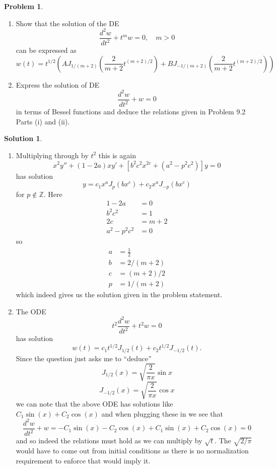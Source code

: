 \documentclass[10pt]{article}
\theoremstyle{definition}
\newtheorem{problem}{Problem}
\newtheorem{soln}{Solution}
\begin{document}
\begin{problem}~
\begin{enumerate}[label=(\alph*)]
  \item Show that the solution of the DE
        $$\frac{d^2w}{dt^2}+t^mw=0,\quad m>0$$
        can be expressed as
        $$w(t)=t^{1/2}\left(AJ_{1/(m+2)}\left(\frac{2}{m+2}t^{(m+2)/2}\right)+BJ_{-1/(m+2)}\left(\frac{2}{m+2}t^{(m+2)/2}\right)\right)$$
  \item Express the solution of DE
        $$\frac{d^2w}{dt^2}+w=0$$
        in terms of Bessel functions and deduce the relations given in Problem 9.2 Parts (i) and (ii).
\end{enumerate}
\end{problem}
\begin{soln}~
  \begin{enumerate}[label=(\alph*)]
    \item Multiplying through by $t^2$ this is again $$x^2y''+(1-2a)xy'+\left[b^2c^2x^{2c}+(a^2-p^2c^2)\right]y=0$$
          has solution
          $$y=c_1x^aJ_p(bx^c)+c_2x^aJ_{-p}(bx^c)$$
          for $p\notin \mathbb{Z}$. Here
          \begin{align*}
            1-2a       & =0   \\
            b^2c^2     & =1   \\
            2c         & =m+2 \\
            a^2-p^2c^2 & =0
          \end{align*}
          so
          \begin{align*}
            a & =\frac{1}{2} \\
            b & =2/(m+2)     \\
            c & =(m+2)/2     \\
            p & =1/(m+2)
          \end{align*}
          which indeed gives us the solution given in the problem statement.
    \item The ODE $$t^2\frac{d^2w}{dt^2}+t^2w=0$$
          has solution
          $$w(t)=c_1t^{1/2}J_{1/2}(t)+c_2t^{1/2}J_{-1/2}(t).$$
          Since the question just asks me to ``deduce''
          $$J_{1/2}(x)=\sqrt{\frac{2}{\pi x}}\sin x$$
          $$J_{-1/2}(x)=\sqrt{\frac{2}{\pi x}}\cos x$$
          we can note that the above ODE has solutions like $C_1\sin(x)+C_2\cos(x)$ and when plugging these in we see that
          $$\frac{d^2w}{dt^2}+w=-C_1\sin(x)-C_2\cos(x)+C_1\sin(x)+C_2\cos(x)=0$$
          and so indeed the relations must hold as we can multiply by $\sqrt{t}$. The $\sqrt{2/\pi}$ would have to come out from initial conditions
          as there is no normalization requirement to enforce that would imply it.
  \end{enumerate}
\end{soln}
\end{document}
